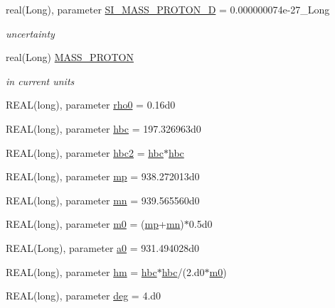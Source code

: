 \begin{DoxyCompactItemize}
real(Long), parameter \hyperlink{namespaceclass__PhysicalConstants_a22a22c3caa590bb80989439fea138dca}{SI\_\-MASS\_\-PROTON\_\-D} = 0.000000074e-\/27\_\-Long
\begin{DoxyCompactList}\small\item\em uncertainty \item\end{DoxyCompactList}\item 
real(Long) \hyperlink{namespaceclass__PhysicalConstants_a91ea21ef8a0bb29bf99b041c512b6859}{MASS\_\-PROTON}
\begin{DoxyCompactList}\small\item\em in current units \item\end{DoxyCompactList}\item 
REAL(long), parameter \hyperlink{namespaceclass__PhysicalConstants_afd1e8c949a1607aa74c06b2cf93718a8}{rho0} = 0.16d0
\item 
REAL(long), parameter \hyperlink{namespaceclass__PhysicalConstants_a7d9801ae88aee6ffd97a9c8e988c66ec}{hbc} = 197.326963d0
\item 
REAL(long), parameter \hyperlink{namespaceclass__PhysicalConstants_a122a8419f83dc397e3a760e7b07d672f}{hbc2} = \hyperlink{namespaceclass__PhysicalConstants_a7d9801ae88aee6ffd97a9c8e988c66ec}{hbc}$\ast$\hyperlink{namespaceclass__PhysicalConstants_a7d9801ae88aee6ffd97a9c8e988c66ec}{hbc}
\item 
REAL(long), parameter \hyperlink{namespaceclass__PhysicalConstants_af900f95fb8cae7b7b7b9b8489734d0e1}{mp} = 938.272013d0
\item 
REAL(long), parameter \hyperlink{namespaceclass__PhysicalConstants_a666719c036c1ac2a2ad0f78137eb7b99}{mn} = 939.565560d0
\item 
REAL(long), parameter \hyperlink{namespaceclass__PhysicalConstants_a6a2b98e5cc0028b726afab655255b5c8}{m0} = (\hyperlink{namespaceclass__PhysicalConstants_af900f95fb8cae7b7b7b9b8489734d0e1}{mp}+\hyperlink{namespaceclass__PhysicalConstants_a666719c036c1ac2a2ad0f78137eb7b99}{mn})$\ast$0.5d0
\item 
REAL(Long), parameter \hyperlink{namespaceclass__PhysicalConstants_a1e0e8fd471248a1082bc06f8ff7ecd65}{a0} = 931.494028d0
\item 
REAL(long), parameter \hyperlink{namespaceclass__PhysicalConstants_a5d8b8543af92098fe08729607d72a22a}{hm} = \hyperlink{namespaceclass__PhysicalConstants_a7d9801ae88aee6ffd97a9c8e988c66ec}{hbc}$\ast$\hyperlink{namespaceclass__PhysicalConstants_a7d9801ae88aee6ffd97a9c8e988c66ec}{hbc}/(2.d0$\ast$\hyperlink{namespaceclass__PhysicalConstants_a6a2b98e5cc0028b726afab655255b5c8}{m0})
\item 
REAL(long), parameter \hyperlink{namespaceclass__PhysicalConstants_ace0fddb4ccc5b1acf56249fc4ab56379}{deg} = 4.d0
\end{DoxyCompactItemize}


